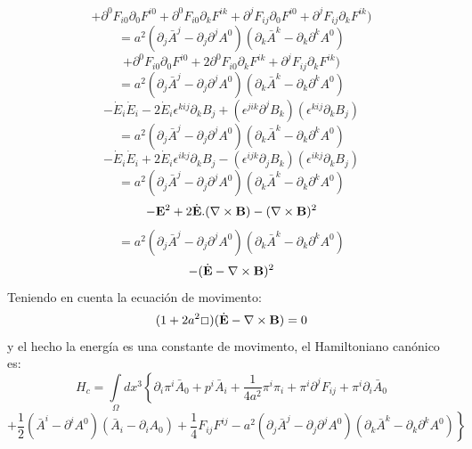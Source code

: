 \documentclass[a4paper,12pt]{article}
\begin{document}
$$+\partial^0 F_{i0}\partial_0 F^{i0}+\partial^0 F_{i0}\partial_k F^{ik}+\partial^j F_{ij}\partial_0 F^{i0}+\partial^j F_{ij}\partial_k F^{ik})$$ 
$$=a^2(\partial_j\bar{A}^j-\partial_j\partial^jA^0)(\partial_k\bar{A}^k-\partial_k\partial^kA^0)$$
$$+\partial^0 F_{i0}\partial_0 F^{i0}+2\partial^0 F_{i0}\partial_k F^{ik}+\partial^j F_{ij}\partial_k F^{ik})$$
$$=a^2(\partial_j\bar{A}^j-\partial_j\partial^jA^0)(\partial_k\bar{A}^k-\partial_k\partial^kA^0)$$
$$-\dot E_i\dot E_i-2\dot E_i\epsilon^{kij}\partial_k B_j+(\epsilon^{jik}\partial^j B_k)(\epsilon^{ kij}\partial_k B_j)$$
$$=a^2(\partial_j\bar{A}^j-\partial_j\partial^jA^0)(\partial_k\bar{A}^k-\partial_k\partial^kA^0)$$
$$-\dot E_i\dot E_i+2\dot E_i\epsilon^{ikj}\partial_k B_j-(\epsilon^{ijk}\partial_j B_k)(\epsilon^{ ikj}\partial_k B_j)$$
$$=a^2(\partial_j\bar{A}^j-\partial_j\partial^jA^0)(\partial_k\bar{A}^k-\partial_k\partial^kA^0)$$
$$-{\bf E}^2+2\dot {\bf E}.(\nabla \times {\bf B})-(\nabla \times {\bf B})^2$$
$$=a^2(\partial_j\bar{A}^j-\partial_j\partial^jA^0)(\partial_k\bar{A}^k-\partial_k\partial^kA^0)$$
$$-( \dot {\bf E}-\nabla \times {\bf B})^2$$
Teniendo en cuenta la ecuación de movimento:
\begin{equation}
(1+2a^2\Box)(\dot{\bf E}-\nabla \times {\bf B} )= 0 
\end{equation}
y el hecho la energía es una constante de movimento, el Hamiltoniano canónico es:
\begin{equation}
H_c=\int\limits_{\Omega}dx^{3}\left\{\partial_i \pi^i\bar{A}_0+p^{i}\bar{A}_i +\frac{1}{4a^2}\pi^{i}\pi_i+\pi^{i}\partial^j F_{ij}+\pi^{i}\partial_i\bar{ A}_0 \right. 
\end{equation}
$$\left.+\frac{1}{2}(\bar{A}^i-\partial^i A^0)(\bar{A}_i-\partial_i A_0)+\frac{1}{4} F_{ij}F^{ij}-a^2(\partial_j\bar{A}^j-\partial_j\partial^jA^0)(\partial_k\bar{A}^k-\partial_k\partial^kA^0)\right\}
$$
\vspace{0,4cm}

\\
\end{document}
